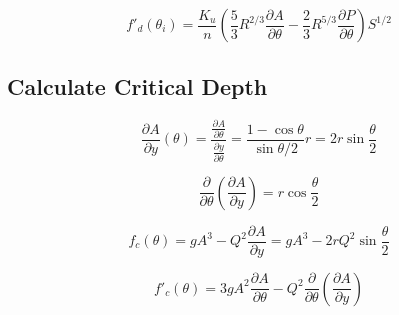 \begin{equation}  
f'_d(\theta_{i})= \frac{K_u}{n}\left(\frac{5}{3}R^{2/3}\frac{\partial A}{\partial \theta} -  \frac{2}{3}R^{5/3}\frac{\partial P}{\partial \theta}\right)S^{1/2}
\end{equation}

\subsection{Calculate Critical Depth}

\begin{equation}  
\frac{\partial A}{\partial y} (\theta)= \frac{\frac{\partial A}{\partial \theta}}{\frac{\partial y}{\partial \theta}}=\frac{1-\cos\theta}{\sin \theta/2}r = 2r\sin\frac{\theta}{2}
\end{equation}

\begin{equation}  
\frac{\partial}{\partial \theta} \left(\frac{\partial A}{\partial y} \right) = r \cos \frac{\theta}{2}
\end{equation}


\begin{equation}  
f_c(\theta)= gA^3 - Q^2\frac{\partial A}{\partial y} =  gA^3 - 2rQ^2 \sin\frac{\theta}{2}
\end{equation}

\begin{equation}  
f'_c(\theta)= 3gA^2\frac{\partial A}{\partial \theta} - Q^2\frac{\partial}{\partial \theta} \left(\frac{\partial A}{\partial y} \right)
\end{equation}
